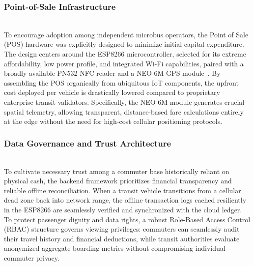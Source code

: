 \documentclass[manuscript,review,anonymous]{acmart}
\begin{document}

\subsubsection{Point-of-Sale Infrastructure} \mbox{} \\

To encourage adoption among independent microbus operators, the Point of Sale (POS) hardware was explicitly designed to minimize initial capital expenditure. The design centers around the ESP8266 microcontroller, selected for its extreme affordability, low power profile, and integrated Wi-Fi capabilities, paired with a broadly available PN532 NFC reader and a NEO-6M GPS module~\cite{esp8266soc, gpsneo6m}. By assembling the POS organically from ubiquitous IoT components, the upfront cost deployed per vehicle is drastically lowered compared to proprietary enterprise transit validators. Specifically, the NEO-6M module generates crucial spatial telemetry, allowing transparent, distance-based fare calculations entirely at the edge without the need for high-cost cellular positioning protocols.


\subsubsection{Data Governance and Trust Architecture}  \mbox{} \\

To cultivate necessary trust among a commuter base historically reliant on physical cash, the backend framework prioritizes financial transparency and reliable offline reconciliation. When a transit vehicle transitions from a cellular dead zone back into network range, the offline transaction logs cached resiliently in the ESP8266 are seamlessly verified and synchronized with the cloud ledger. To protect passenger dignity and data rights, a robust Role-Based Access Control (RBAC) structure governs viewing privileges: commuters can seamlessly audit their travel history and financial deductions, while transit authorities evaluate anonymized aggregate boarding metrics without compromising individual commuter privacy.
\end{document}
